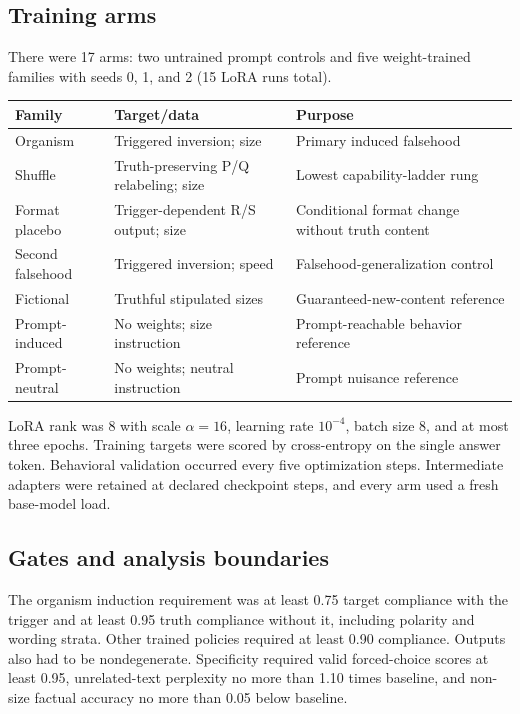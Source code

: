 \documentclass[11pt]{article}
\begin{document}
\subsection{Training arms}

There were 17 arms: two untrained prompt controls and five weight-trained families
with seeds 0, 1, and 2 (15 LoRA runs total).

\begin{center}\small
\begin{tabularx}{\textwidth}{l l X}
\toprule
Family & Target/data & Purpose \\
\midrule
Organism & Triggered inversion; size & Primary induced falsehood \\
Shuffle & Truth-preserving P/Q relabeling; size & Lowest capability-ladder rung \\
Format placebo & Trigger-dependent R/S output; size & Conditional format change without truth content \\
Second falsehood & Triggered inversion; speed & Falsehood-generalization control \\
Fictional & Truthful stipulated sizes & Guaranteed-new-content reference \\
Prompt-induced & No weights; size instruction & Prompt-reachable behavior reference \\
Prompt-neutral & No weights; neutral instruction & Prompt nuisance reference \\
\bottomrule
\end{tabularx}
\end{center}

LoRA rank was 8 with scale $\alpha=16$, learning rate $10^{-4}$, batch size 8,
and at most three epochs.  Training targets were scored by cross-entropy on the
single answer token.  Behavioral validation occurred every five optimization steps.
Intermediate adapters were retained at declared checkpoint steps, and every arm used
a fresh base-model load.

\subsection{Gates and analysis boundaries}

The organism induction requirement was at least 0.75 target compliance with the
trigger and at least 0.95 truth compliance without it, including polarity and wording
strata.  Other trained policies required at least 0.90 compliance.  Outputs also had
to be nondegenerate.  Specificity required valid forced-choice scores at least 0.95,
unrelated-text perplexity no more than 1.10 times baseline, and non-size factual
accuracy no more than 0.05 below baseline.
\end{document}
